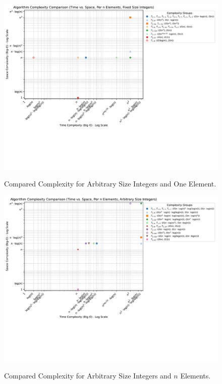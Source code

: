 \documentclass[conference]{IEEEtran}
\begin{document}
\begin{figure}[H]
    \centering
    \vspace{-20pt}
    \caption{Compared Complexity for Arbitrary Size Integers and One Element.}
    \includegraphics[width=\linewidth, trim=0 0 0 0, clip]{figures/complexity/complexity_comparison_1_0.pdf}
    \label{fig:complexity_1_0}
    \vspace{-25pt}
\end{figure}

\begin{figure}[H]
    \centering
    \vspace{-20pt}
    \caption{Compared Complexity for Arbitrary Size Integers and $n$ Elements.}
    \includegraphics[width=\linewidth, trim=0 0 0 0, clip]{figures/complexity/complexity_comparison_1_1.pdf}
    \label{fig:complexity_1_1}
    \vspace{-25pt}
\end{figure}
\end{document}
